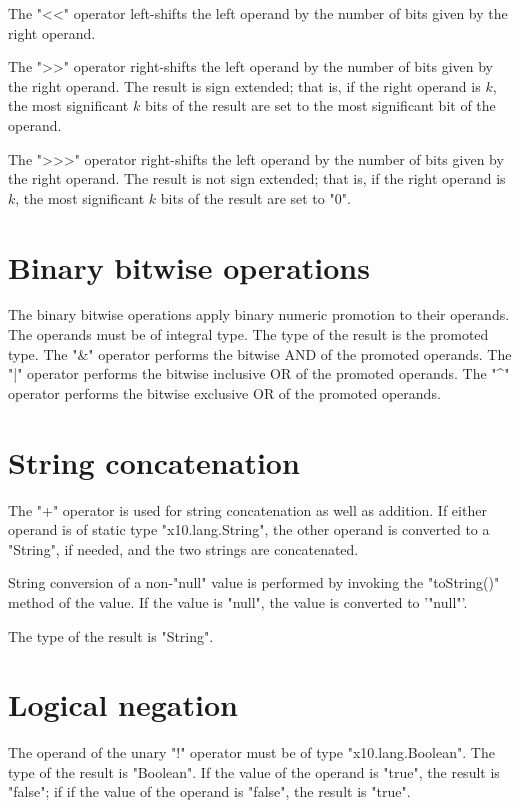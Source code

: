 The \xcd"<<" operator left-shifts the left operand by the number of
bits given by the right operand.

The \xcd">>" operator right-shifts the left operand by the number of
bits given by the right operand.  The result is sign extended;
that is, if the right operand is $k$,
the most significant $k$ bits of the result are set to the most
significant bit of the operand.

The \xcd">>>" operator right-shifts the left operand by the number of
bits given by the right operand.  The result is not sign extended;
that is, if the right operand is $k$,
the most significant $k$ bits of the result are set to \xcd"0".

\section{Binary bitwise operations}

The binary bitwise operations apply binary numeric promotion
to their operands. The operands must be of integral type.
The type of the result is the promoted type.
The \xcd"&" operator  performs the bitwise AND of the promoted operands.
The \xcd"|" operator  performs the bitwise inclusive OR of the promoted operands.
The \xcd"^" operator  performs the bitwise exclusive OR of the promoted operands.

\section{String concatenation}

The \xcd"+"  operator is used for string concatenation 
 as well as addition.
If either operand is of static type \xcd"x10.lang.String",
 the other operand is converted to a \xcd"String", if needed,
  and  the two strings  are concatenated.

 String conversion of a non-\xcd"null" value is  performed by invoking the
 \xcd"toString()" method of the value.
  If the value is \xcd"null", the value is converted to 
  \xcd'"null"'.

The type of the result is \xcd"String".

\section{Logical negation}

The operand of the  unary \xcd"!" operator 
must be of type \xcd"x10.lang.Boolean".
The type of the result is \xcd"Boolean".
If the value of the operand is \xcd"true", the result is \xcd"false"; if
if the value of the operand  is \xcd"false", the result is \xcd"true".

